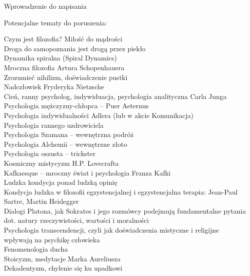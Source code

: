 Wprowadzenie do napisania

\vin Potencjalne tematy do poruszenia:

Czym jest filozofia? Miłość do mądrości \\
Droga do samopoznania jest drogą przez piekło \\
Dynamika spiralna (Spiral Dynamics) \\
Mroczna filozofia Artura Schopenhauera \\
Zrozumieć nihilizm, doświadczenie pustki \\
Nadczłowiek Fryderyka Nietzsche \\
Cień, ranny psycholog, indywiduacja, psychologia analityczna Carla Junga \\
Psychologia mężczyzny-chłopca -- Puer Aeternus \\
Psychologia indywidualności Adlera (lub w akcie Komunikacja) \\
Psychologia rannego uzdrowiciela \\
Psychologia Szamana -- wewnętrzna podróż \\
Psychologia Alchemii -- wewnętrzne złoto \\
Psychologia oszusta -- trickster \\
Kosmiczny mistycyzm H.P. Lovecrafta \\
Kafkaesque -- mroczny świat i psychologia Franza Kafki \\
Ludzka kondycja ponad ludzką opinię \\
Kondycja ludzka w filozofii egzystencjalnej i egzystencjalna terapia: Jean-Paul Sartre, Martin Heidegger \\
Dialogi Platona, jak Sokrates i jego rozmówcy podejmują fundamentalne pytania dot. natury rzeczywistości, wartości i moralności \\
Psychologia transcendencji, czyli jak doświadczenia mistyczne i religijne wpływają na psychikę człowieka \\
Fenomenologia ducha \\
Stoicyzm, medytacje Marka Aureliusza \\
Dekadentyzm, chylenie się ku upadkowi

